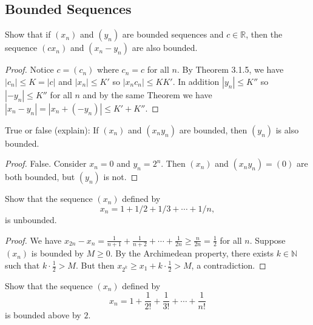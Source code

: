 \subsection{Bounded Sequences}

\begin{tcolorbox}[title=Problem 1, breakable]
    Show that if $(x_n)$ and $(y_n)$ are bounded sequences 
    and $c \in \mathbb{R}$, then the sequence $(cx_n)$ and $(x_n - y_n)$ are also bounded.
\end{tcolorbox}

\begin{proof}
    Notice $c = (c_n)$ where $c_n = c$ for all $n$.
    By Theorem 3.1.5, we have $|c_n| \le K = |c|$ and $|x_n| \le K'$
        so $|x_n c_n| \le K K'$.
    In addition $|y_n| \le K''$ so $|-y_n| \le K''$ for all $n$ and by the same Theorem we have 
    $|x_n - y_n| = |x_n + (-y_n)| \le K' + K''$.
\end{proof}

\begin{tcolorbox}[title=Problem 2, breakable]
    True or false (explain): If $(x_n)$ and $(x_n y_n)$ are bounded,
    then $(y_n)$ is also bounded.
\end{tcolorbox}

\begin{proof}
    False. Consider $x_n = 0$ and $y_n = 2^n$.
    Then $(x_n)$ and $(x_n y_n) = (0)$ are both bounded, but $(y_n)$ is not.
\end{proof}

\begin{tcolorbox}[title=Problem 3, breakable]
    Show that the sequence $(x_n)$ defined by  
    \[x_n = 1 + 1/2  + 1/3 + \cdots + 1/n,\]
    is unbounded.
\end{tcolorbox}

\begin{proof}
    We have $x_{2n} - x_n = \frac{1}{n+1} + \frac{1}{n+2} + \cdots + \frac{1}{2n} \ge \frac{n}{2n} = \frac{1}{2}$ for all $n$.
    Suppose $(x_n)$ is bounded by $M \ge 0$. By the Archimedean property, there exists $k \in \mathbb{N}$ such that $k \cdot \frac{1}{2} > M$.
    But then $x_{2^k} \ge x_1 + k \cdot \frac{1}{2} > M$, a contradiction.
\end{proof}

\begin{tcolorbox}[title=Problem 6, breakable]
    Show that the sequence $(x_n)$ defined by
    \[x_n = 1 + \frac{1}{2!} + \frac{1}{3!} + \cdots + \frac{1}{n!}\]
    is bounded above by $2$.
\end{tcolorbox}

